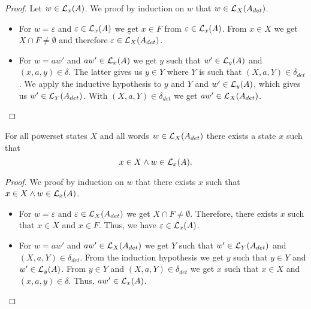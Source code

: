 \begin{proof}
    Let $w \in \mathcal{L}_{x}(A)$. We proof by induction on $w$ that $w \in \mathcal{L}_{X}(A_{det})$. 
    \begin{itemize}
        \item
            For $w = \varepsilon$ and $\varepsilon \in \mathcal{L}_{x}(A)$ we get $x \in F$ from $\varepsilon \in \mathcal{L}_{x}(A)$. 
            From $x \in X$ we get $X \cap F \neq \emptyset$ and therefore $\varepsilon \in \mathcal{L}_{X}(A_{det})$.
        \item
            For $w = a w'$ and $a w' \in \mathcal{L}_{x}(A)$ we get $y$ such that $w' \in \mathcal{L}_{y}(A)$ and $(x,a,y) \in \delta$.
            The latter gives us $y \in Y$ where $Y$ is such that $(X, a, Y) \in \delta_{det}$.
            We apply the inductive hypothesis to $y$ and $Y$ and $w' \in \mathcal{L}_{y}(A)$, 
            which gives us $w' \in \mathcal{L}_{Y}(A_{det})$.
            With $(X, a, Y) \in \delta_{det}$ we get $a w' \in \mathcal{L}_{X}(A_{det})$.
    \end{itemize}
\end{proof}


\begin{lemma}
    \label{nfa_to_dfa_sound}
    For all powerset states $X$ and all words $w \in \mathcal{L}_{X}(A_{det})$ there exists a state $x$ such that 
    \begin{equation*}
        x \in X \wedge
        w \in \mathcal{L}_{x}(A).
    \end{equation*}
\end{lemma}

\begin{proof}
    We proof by induction on $w$ that there exists $x$ such that $x \in X \wedge w \in \mathcal{L}_{x}(A)$. 
    \begin{itemize}
        \item
            For $w = \varepsilon$ and $\varepsilon \in \mathcal{L}_{X}(A_{det})$ we get  $X \cap F \neq \emptyset$.
            Therefore, there exists $x$ such that $x \in X$ and $x \in F$.
            Thus, we have $\varepsilon \in \mathcal{L}_{x}(A)$.
        \item
            For $w = a w'$ and $a w' \in \mathcal{L}_{X}(A_{det})$ we get $Y$ such that $w' \in \mathcal{L}_{Y}(A_{det})$ and $(X,a,Y) \in \delta_{det}$.
            From the induction hypothesis we get $y$ such that $y \in Y$ and $w' \in \mathcal{L}_{y}(A)$.
            From $y \in Y$ and $(X, a, Y) \in \delta_{det}$ we get $x$ such that $x \in X$ and $(x, a, y) \in \delta$.
            Thus, $a w' \in \mathcal{L}_{x}(A)$.
    \end{itemize}
\end{proof}

